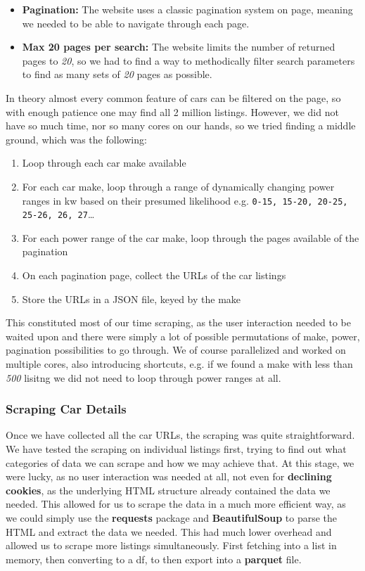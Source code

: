\documentclass[12pt]{article}
\begin{document}
\begin{itemize}
  \item \textbf{Pagination:} The website uses a classic pagination system on page, meaning we needed to be able to navigate through each page.
  \item \textbf{Max 20 pages per search:} The website limits the number of returned pages to \textit{20}, so we had to find a way to methodically filter search parameters to find as many sets of \textit{20} pages as possible.
\end{itemize}

In theory almost every common feature of cars can be filtered on the page, so with enough patience one may find all 2 million listings. However, we did not have so much time, nor so many cores on our hands, so we tried finding a middle ground, which was the following:

\begin{enumerate}
  \item Loop through each car make available
  \item For each car make, loop through a range of dynamically changing power ranges in kw based on their presumed likelihood e.g. \texttt{0-15, 15-20, 20-25, 25-26, 26, 27}\dots
  \item For each power range of the car make, loop through the pages available of the pagination
  \item On each pagination page, collect the URLs of the car listings
  \item Store the URLs in a JSON file, keyed by the make
\end{enumerate}

This constituted most of our time scraping, as the user interaction needed to be waited upon and there were simply a lot of possible permutations of make, power, pagination possibilities to go through.
We of course parallelized and worked on multiple cores, also introducing shortcuts, e.g. if we found a make with less than \textit{500} lisitng we did not need to loop through power ranges at all.

\subsubsection{Scraping Car Details}

Once we have collected all the car URLs, the scraping was quite straightforward. We have tested the scraping on individual listings first, trying to find out what categories of data we can scrape and how we may achieve that. At this stage, we were lucky, as no user interaction was needed at all, not even for \textbf{declining cookies}, as the underlying HTML structure already contained the data we needed.
This allowed for us to scrape the data in a much more efficient way, as we could simply use the \textbf{requests} package and \textbf{BeautifulSoup} to parse the HTML and extract the data we needed. This had much lower overhead and allowed us to scrape more listings simultaneously. First fetching into a list in memory, then converting to a df, to then export into a \textbf{parquet} file.
\end{document}
